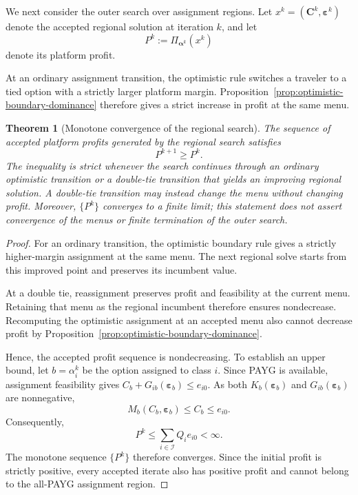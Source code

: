 \documentclass{article}
\newtheorem{theorem}{Theorem}
\begin{document}
We next consider the outer search over assignment regions. Let
$x^k=(\bm C^k,\bm\varepsilon^k)$ denote the accepted regional solution
at iteration $k$, and let
\begin{equation}
    P^k
    :=
    \Pi_{\bm\alpha^k}(x^k)
\end{equation}
denote its platform profit.

At an ordinary assignment transition, the optimistic rule switches a
traveler to a tied option with a strictly larger platform margin.
Proposition~\ref{prop:optimistic-boundary-dominance} therefore gives a
strict increase in profit at the same menu.

\begin{theorem}[Monotone convergence of the regional search]
The sequence of accepted platform profits generated by the regional
search satisfies
\begin{equation}
    P^{k+1}\geq P^k.
\end{equation}
The inequality is strict whenever the search continues through an
ordinary optimistic transition or a double-tie transition that yields
an improving regional solution. A double-tie transition may instead
change the menu without changing profit. Moreover, $\{P^k\}$ converges
to a finite limit; this statement does not assert convergence of the
menus or finite termination of the outer search.
\label{thm:outer-convergence}
\end{theorem}

\begin{proof}
For an ordinary transition, the optimistic boundary rule gives a
strictly higher-margin assignment at the same menu. The next regional
solve starts from this improved point and preserves its incumbent value.

At a double tie, reassignment preserves profit and feasibility at the
current menu. Retaining that menu as the regional incumbent therefore
ensures nondecrease. Recomputing the optimistic assignment at an
accepted menu also cannot decrease profit by
Proposition~\ref{prop:optimistic-boundary-dominance}.

Hence, the accepted profit sequence is nondecreasing. To establish an
upper bound, let $b=\alpha_i^k$ be the option assigned to class $i$.
Since PAYG is available, assignment feasibility gives
$C_b+G_{ib}(\bm\varepsilon_b)\leq e_{i0}$. As both
$K_b(\bm\varepsilon_b)$ and $G_{ib}(\bm\varepsilon_b)$ are nonnegative,
\begin{equation}
    M_b(C_b,\bm\varepsilon_b)
    \leq C_b \leq e_{i0}.
\end{equation}
Consequently,
\begin{equation}
    P^k\leq\sum_{i\in\mathcal I}Q_i e_{i0}<\infty.
    \label{eq:payg-profit-upper-bound}
\end{equation}
The monotone sequence $\{P^k\}$ therefore converges. Since the initial
profit is strictly positive, every accepted iterate also has positive
profit and cannot belong to the all-PAYG assignment region.
\end{proof}
\end{document}
